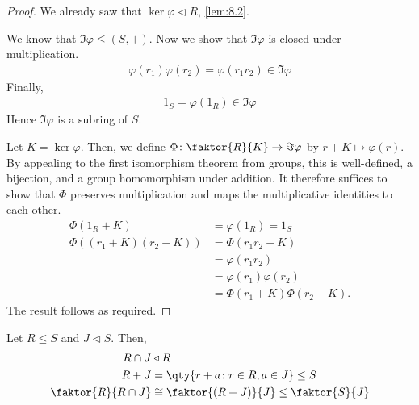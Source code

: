 \begin{proof}
	We already saw that $\ker \varphi \triangleleft R$, \cref{lem:8.2}.

	We know that $\Im \varphi \leq (S, +)$.
	Now we show that $\Im \varphi$ is closed under multiplication.
	\begin{align*}
		\varphi(r_1) \varphi(r_2) = \varphi(r_1 r_2) \in \Im \varphi
	\end{align*}
	Finally,
	\begin{align*}
		1_S = \varphi(1_R) \in \Im \varphi
	\end{align*}
	Hence $\Im \varphi$ is a subring of $S$.

	Let $K = \ker \varphi$.
	Then, we define $\Phi \colon \faktor{R}{K} \to \Im \varphi$ by $r+K \mapsto \varphi(r)$.
	By appealing to the first isomorphism theorem from groups, this is well-defined, a bijection, and a group homomorphism under addition.
	It therefore suffices to show that $\Phi$ preserves multiplication and maps the multiplicative identities to each other.
	\begin{align*}
		\Phi(1_R + K) &= \varphi(1_R) = 1_S \\
		\Phi((r_1+K)(r_2+K)) &= \Phi(r_1 r_2 +K) \\
		&= \varphi(r_1 r_2) \\
		&= \varphi(r_1) \varphi(r_2) \\
		&= \Phi(r_1 + K) \Phi(r_2 + K).
	\end{align*}
	The result follows as required.
\end{proof}

\begin{theorem}
	Let $R \leq S$ and $J \triangleleft S$.
	Then,
	\begin{align*}
		R \cap J &\triangleleft R \\
		R + J &= \qty{r+a \colon r\in R, a \in J} \leq S \\
		\faktor{R}{R \cap J} &\cong \faktor{(R+J)}{J} \leq \faktor{S}{J}
	\end{align*}
\end{theorem}

